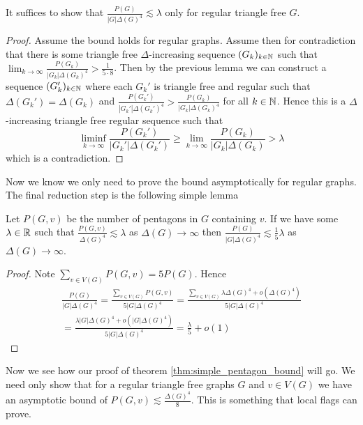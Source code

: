 \begin{corollary}
    \label{corollary:pentagon_regular_suffices}
    It suffices to show that $\frac{P(G)}{|G|\Delta(G)^4} \lesssim \lambda$
    only for regular triangle free $G$.
\end{corollary}

\begin{proof}
    Assume the bound holds for regular graphs.
    Assume then for contradiction that
    there is some triangle free $\Delta$-increasing sequence $(G_k)_{k\in\mathbb{N}}$
    such that $\lim_{k\to\infty} \frac{P(G_k)}{|G_k|\Delta(G_k)^4} > \frac{1}{5\cdot 8}$.
    Then by the previous lemma we can construct a sequence
    $(G_k')_{k\in\mathbb{N}}$ where each $G_k'$ is triangle free and regular
    such that $\Delta(G_k')=\Delta(G_k)$ and
    $\frac{P(G_k')}{|G_k'|\Delta(G_k')^4} >\frac{P(G_k)}{|G_k|\Delta(G_k)^4}$
    for all $k\in\mathbb{N}$. Hence this is a $\Delta$-increasing triangle free regular
    sequence such that
    \[
        \liminf_{k\to\infty} \frac{P(G_k')}{|G_k'|\Delta(G_k')}
        \geq
        \lim_{k\to\infty} \frac{P(G_k)}{|G_k|\Delta(G_k)}
        > \lambda
    \]
    which is a contradiction.
\end{proof}

Now we know we only need to prove the bound asymptotically for regular graphs.
The final reduction step is the following simple lemma
\begin{lemma}
    \label{lemma:pentagon_local_count}
    Let $P(G, v)$ be the number of pentagons in $G$ containing $v$. If we have some
    $\lambda \in \mathbb{R}$ such that
    $\frac{P(G, v)}{\Delta(G)^4} \lesssim \lambda$ as $\Delta(G)\to\infty$
    then
    $\frac{P(G)}{|G|\Delta(G)^4} \lesssim \frac{1}{5}\lambda$ as $\Delta(G)\to\infty$.
\end{lemma}

\begin{proof}
    Note $\sum_{v\in V(G)}P(G, v) = 5P(G)$. Hence
    \begin{multline*}
        \frac{P(G)}{|G|\Delta(G)^4}
        = \frac{\sum_{v\in V(G)} P(G, v)}{5|G|\Delta(G)^4}
        = \frac{\sum_{v \in V(G)} \lambda\Delta(G)^4 + o(\Delta(G)^4)}{5|G|\Delta(G)^4}\\
        = \frac{\lambda|G|\Delta(G)^4 + o(|G|\Delta(G)^4)}{5|G|\Delta(G)^4}
        = \frac{\lambda}{5} + o(1)
    \end{multline*}
\end{proof}

Now we see how our proof of theorem \ref{thm:simple_pentagon_bound} will go.
We need only show that for a regular triangle free graphs $G$ and
$v\in V(G)$ we have an asymptotic bound of $P(G, v) \lesssim \frac{\Delta(G)^4}{8}$.
This is something that local flags can prove.

